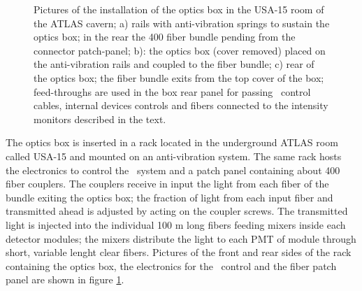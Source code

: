 \begin{figure}[htbp]
\begin{center}
\caption{Pictures of the installation of the optics box in the USA-15 room of the
ATLAS cavern; a) rails with anti-vibration springs to sustain the optics box; in the
rear the 400 fiber bundle pending from the connector patch-panel; b): the optics box
(cover removed) placed on the anti-vibration rails and coupled to the fiber bundle;
c) rear of the optics box; the fiber bundle exits from the top cover of the box;
feed-throughs are used in the box rear panel for passing \laser~control cables,
internal devices controls and fibers connected to the intensity monitors described
in the text.  
}\label{fig:x.1}
\end{center}
\end{figure}

The optics box is inserted in a rack located in the underground ATLAS room called
USA-15 and mounted on an anti-vibration system. 
The same rack hosts the electronics 
to control the \lasii~system and a patch panel containing about 400 fiber
couplers. The couplers receive in input the light from each fiber of the bundle
exiting the optics box; the fraction of light from each input fiber and transmitted
ahead is adjusted by acting on the coupler screws. The transmitted light is injected
into the individual 100 m long fibers feeding mixers inside each detector modules;
the mixers distribute the light to each PMT of module through short, variable lenght
clear fibers. Pictures of the front and rear sides of the rack containing the
optics box, the electronics for the \lasii~control and the fiber patch panel are shown in figure \ref{fig:x.1}.

